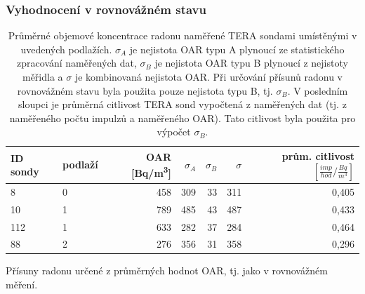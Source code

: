 \subsubsection{Vyhodnocení v rovnovážném stavu}
\begin{table}[H]
    \centering
    \caption{Průměrné objemové koncentrace radonu naměřené TERA sondami umístěnými v uvedených podlažích. $\sigma_A$ je nejistota OAR typu A plynoucí ze statistického zpracování naměřených dat, $\sigma_B$ je nejistota OAR typu B plynoucí z nejistoty měřidla a $\sigma$ je kombinovaná nejistota OAR. Při určování přísunů radonu v rovnovážném stavu byla použita pouze nejistota typu B, tj. $\sigma_B$. V posledním sloupci je průměrná citlivost TERA sond vypočtená z naměřených dat (tj. z naměřeného počtu impulzů a naměřeného OAR). Tato citlivost byla použita pro výpočet $\sigma_B$.}
    \label{tab:skala75_OARprumerne}
    \begin{tabular}{llrrrrr}
\toprule
ID sondy&podlaží& OAR [\si{Bq/m^3}]& $\sigma_A$ & $\sigma_B$ &$\sigma$& prům. citlivost $\left[\si{\frac{imp}{hod}/\frac{Bq}{m^3}}\right]$\\ 
\midrule
8  &0 & 458 & 309 & 33 & 311&0,405\\
10 &1 & 789 & 485 & 43 & 487&0,433\\
112&1 & 633 & 282 & 37 & 284&0,464\\
88 &2 & 276 & 356 & 31 & 358&0,296\\
\bottomrule
    \end{tabular}
\end{table}

\begin{table}[H]
    \centering
    \caption{Přísuny radonu určené z průměrných hodnot OAR, tj. jako v rovnovážném měření.}
    \label{tab:skala75_prisunyRovnovazne}
   
\end{table}


